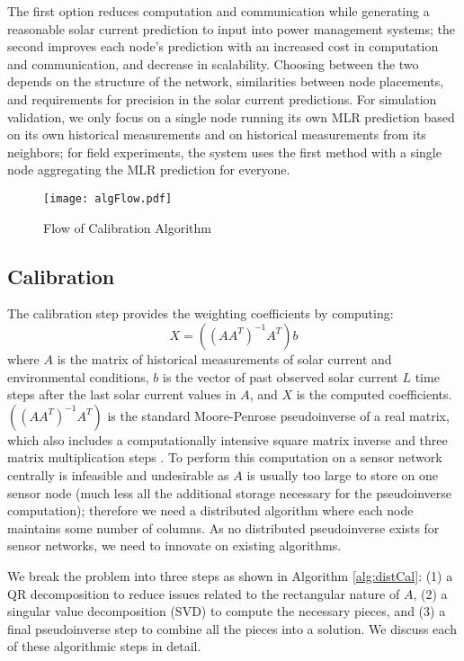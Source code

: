 \documentclass[prodmode,acmtosn]{acmsmall}
\begin{document}
The first option reduces computation and communication while generating a reasonable solar current prediction to input into power management systems; the second improves each node's prediction with an increased cost in computation and communication, and decrease in scalability.
Choosing between the two depends on the structure of the network, similarities between node placements, and requirements for precision in the solar current predictions.
For simulation validation, we only focus on a single node running its own MLR prediction based on its own historical measurements and on historical measurements from its neighbors; for field experiments, the system uses the first method with a single node aggregating the MLR prediction for everyone.

\begin{figure}[h]
\begin{center}
\texttt{[image: algFlow.pdf]}
\end{center}
\caption{Flow of Calibration Algorithm}
\label{fig:algFlow}
\end{figure}

\subsection{Calibration}
The calibration step provides the weighting coefficients by computing:
\begin{equation}
  X=((AA^T)^{-1}A^T)b
\end{equation}
where $A$ is the matrix of historical measurements of solar current and environmental conditions, $b$ is the vector of past observed solar current $L$ time steps after the last solar current values in $A$, and $X$ is the computed coefficients.
$((AA^T)^{-1}A^T)$ is the standard Moore-Penrose pseudoinverse of a real matrix, which also includes a computationally intensive square matrix inverse and three matrix multiplication steps \cite{golubMatrixBook1996}.
To perform this computation on a sensor network centrally is infeasible and undesirable as $A$ is usually too large to store on one sensor node (much less all the additional storage necessary for the pseudoinverse computation); therefore we need a distributed algorithm where each node maintains some number of columns.
As no distributed pseudoinverse exists for sensor networks, we need to innovate on existing algorithms.

We break the problem into three steps as shown in Algorithm \ref{alg:distCal}: (1) a QR decomposition to reduce issues related to the rectangular nature of $A$, (2) a singular value decomposition (SVD) to compute the necessary pieces, and (3) a final pseudoinverse step to combine all the pieces into a solution.
We discuss each of these algorithmic steps in detail.
\end{document}
